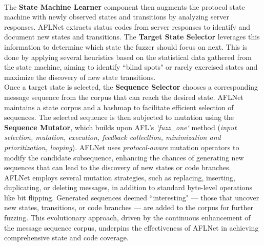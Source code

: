 \\The \textbf{State Machine Learner} component then augments the protocol state machine with newly observed states and transitions by analyzing server responses. AFLNet extracts status codes from server responses to identify and document new states and transitions. The \textbf{Target State Selector} leverages this information to determine which state the fuzzer should focus on next. This is done by applying several heuristics based on the statistical data gathered from the state machine, aiming to identify ``blind spots" or rarely exercised states and maximize the discovery of new state transitions.
\\Once a target state is selected, the \textbf{Sequence Selector} chooses a corresponding message sequence from the corpus that can reach the desired state. AFLNet maintains a state corpus and a hashmap to facilitate efficient selection of sequences. The selected sequence is then subjected to mutation using the \textbf{Sequence Mutator}, which builds upon AFL's \textit{`fuzz\_one`} method (\textit{input selection, mutation, execution, feedback collecltion, minimization and prioritization, looping}). AFLNet uses \textit{protocol-aware} mutation operators to modify the candidate subsequence, enhancing the chances of generating new sequences that can lead to the discovery of new states or code branches.
\\AFLNet employs several mutation strategies, such as replacing, inserting, duplicating, or deleting messages, in addition to standard byte-level operations like bit flipping. Generated sequences deemed ``interesting" — those that uncover new states, transitions, or code branches — are added to the corpus for further fuzzing. This evolutionary approach, driven by the continuous enhancement of the message sequence corpus, underpins the effectiveness of AFLNet in achieving comprehensive state and code coverage.

